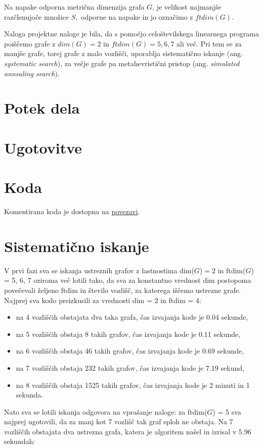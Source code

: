 \documentclass[12pt]{article}
\begin{document}
Na napake odporna metrična dimenzija grafa $G$, je velikost najmanjše razčlenujoče 
množice $S,$ odporne na napake in jo označimo z $ftdim(G).$
\vspace{0,5 cm}

Naloga projektne naloge je bila, da s pomočjo celoštevilskega linearnega programa 
poiščemo grafe z $dim(G) = 2$ in $ftdim(G) = 5, 6, 7$ ali več. Pri tem se za manjše
grafe, torej grafe z malo vozlišči, uporablja sistematično iskanje (ang.\textit{
systematic search}), za večje grafe pa metahevristični pristop (ang.\textit{ simulated 
annealing search}).

\section{Potek dela}


\section{Ugotovitve}

\section{Koda}
Komentirana koda je dostopna na \href{https://github.com/HanaSamsa/Problem-metricnih-dimenzij-odpornih-na-napake.git}{povezavi}.

\section{Sistematično iskanje}

V prvi fazi sva se iskanja ustreznih grafov z lastnostima dim($G$)$ =2$ in ftdim($G$) = 5, 6, 7 
oziroma več lotili tako, da sva za konstantno vrednost dim postopoma povečevali željeno ftdim in 
število vozlišč, za katerega iščemo ustrezne grafe. Najprej sva kodo preizkusili za vrednosti dim = 2 
in ftdim = 4:
\begin{itemize}
    \item na 4 vozliščih obstajata dva taka grafa, čas izvajanja kode je 0.04 sekunde,
    \item na 5 vozliščih obstaja 8 takih grafov, čas izvajanja kode je 0.11 sekunde,
    \item na 6 vozliščih obstaja 46 takih grafov, čas izvajanja kode je 0.69 sekunde,
    \item na 7 vozliščih obstaja 232 takih grafov, čas izvajanja kode je 7.19 sekund,
    \item na 8 vozliščih obstaja 1525 takih grafov, čas izvajanja kode je 2 minuti in 1 sekunda.
\end{itemize}
Nato sva se lotili iskanja odgovora na vprašanje naloge: za ftdim($G$) = 5 sva najprej ugotovili, da za 
manj kot 7 vozlišč tak graf sploh ne obstaja. Na 7 vozliščih obstajata dva ustrezna grafa, katera je 
algoritem našel in izrisal v 5.96 sekundah:
\end{document}
